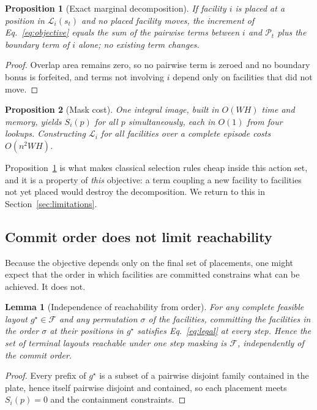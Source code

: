 \documentclass[preprint,12pt,authoryear]{elsarticle}
\newtheorem{prop}{Proposition}
\newtheorem{lem}{Lemma}
\newcommand{\cL}{\mathcal{L}}
\newcommand{\cF}{\mathcal{F}}
\newcommand{\cP}{\mathcal{P}}
\begin{document}
\begin{prop}[Exact marginal decomposition]
\label{prop:marginal}
If facility $i$ is placed at a position in $\cL_i(s_t)$ and no placed facility
moves, the increment of Eq.~\eqref{eq:objective} equals the sum of the pairwise
terms between $i$ and $\cP_t$ plus the boundary term of $i$ alone; no existing
term changes.
\end{prop}
\begin{proof}
Overlap area remains zero, so no pairwise term is zeroed and no boundary bonus is
forfeited, and terms not involving $i$ depend only on facilities that did not
move.
\end{proof}

\begin{prop}[Mask cost]
\label{prop:maskcost}
One integral image, built in $O(WH)$ time and memory, yields $S_i(p)$ for all $p$
simultaneously, each in $O(1)$ from four lookups. Constructing $\cL_i$ for all
facilities over a complete episode costs $O(n^2WH)$.
\end{prop}

Proposition~\ref{prop:marginal} is what makes classical selection rules cheap
inside this action set, and it is a property of \emph{this} objective: a term
coupling a new facility to facilities not yet placed would destroy the
decomposition. We return to this in Section~\ref{sec:limitations}.

\subsection{Commit order does not limit reachability}
Because the objective depends only on the final set of placements, one might
expect that the order in which facilities are committed constrains what can be
achieved. It does not.

\begin{lem}[Independence of reachability from order]
\label{lem:order}
For any complete feasible layout $g^\star\in\cF$ and any permutation $\sigma$ of
the facilities, committing the facilities in the order $\sigma$ at their
positions in $g^\star$ satisfies Eq.~\eqref{eq:legal} at every step. Hence the
set of terminal layouts reachable under one step masking is $\cF$, independently
of the commit order.
\end{lem}
\begin{proof}
Every prefix of $g^\star$ is a subset of a pairwise disjoint family contained in
the plate, hence itself pairwise disjoint and contained, so each placement meets
$S_i(p)=0$ and the containment constraints.
\end{proof}
\end{document}
